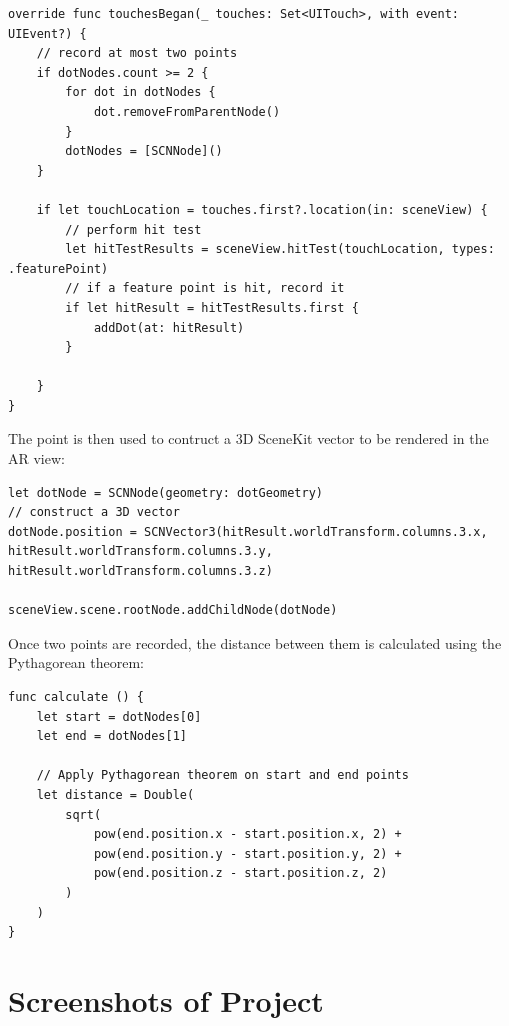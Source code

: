 \documentclass[onecolumn, draftclsnofoot,10pt, compsoc]{IEEEtran}
\begin{document}
\begin{lstlisting}[swift, caption={Hit test}]
override func touchesBegan(_ touches: Set<UITouch>, with event: UIEvent?) {
    // record at most two points
    if dotNodes.count >= 2 {
        for dot in dotNodes {
            dot.removeFromParentNode()
        }
        dotNodes = [SCNNode]()
    }
    
    if let touchLocation = touches.first?.location(in: sceneView) {
        // perform hit test
        let hitTestResults = sceneView.hitTest(touchLocation, types: .featurePoint)
        // if a feature point is hit, record it
        if let hitResult = hitTestResults.first {
            addDot(at: hitResult)
        }
        
    }
}
\end{lstlisting}

The point is then used to contruct a 3D SceneKit vector to be rendered in the AR view:

\begin{lstlisting}[swift, caption={Construct 3D vector}]
let dotNode = SCNNode(geometry: dotGeometry)
// construct a 3D vector
dotNode.position = SCNVector3(hitResult.worldTransform.columns.3.x, hitResult.worldTransform.columns.3.y, hitResult.worldTransform.columns.3.z)

sceneView.scene.rootNode.addChildNode(dotNode)
\end{lstlisting}

Once two points are recorded, the distance between them is calculated using the Pythagorean theorem:

\begin{lstlisting}[swift, caption={Pythagorean theorem}]
func calculate () {
    let start = dotNodes[0]
    let end = dotNodes[1]
    
    // Apply Pythagorean theorem on start and end points
    let distance = Double(
        sqrt(
            pow(end.position.x - start.position.x, 2) +
            pow(end.position.y - start.position.y, 2) +
            pow(end.position.z - start.position.z, 2)
        )
    )
}
\end{lstlisting}


\section{Screenshots of Project}
\end{document}
